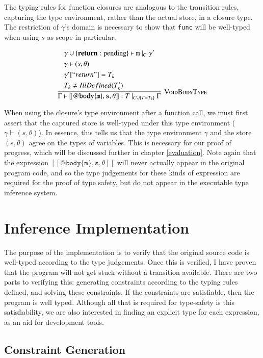 \documentclass[12pt,a4paper,twoside,openright]{report}
\newcommand*{\js}{\texttt}
\begin{document}
The typing rules for function closures are analogous to the transition rules,
capturing the type environment, rather than the actual store, in a closure
type. The restriction of $\gamma$'s domain is necessary to show that \js{func} will be 
well-typed when using $s$ as scope in particular.

$$\infer[\textsc{VoidBodyType}]{
	\Gamma\vdash\mathtt{[\![@body\{m\},s,\theta]\!]}:T\ |_{C\cup\{T=T_k\}}\ \Gamma
}{
	\begin{split}
		&\gamma\cup\{\mathbf{return}:\textrm{pending}\} \vdash \mathtt{m}\ |_C\ \gamma' \\
		&\gamma \vdash (s, \theta) \\
		&\gamma'[``return"] = T_k\\
		&T_k \neq IllDefined(T_k')
	\end{split}
}$$

When using the closure's type environment after a function call, we must first
assert that the captured store is well-typed under this type environment
($\gamma \vdash (s, \theta)$). In essence, this tells us that the type
environment $\gamma$ and the store $(s, \theta)$ agree on the types of
variables. This is necessary for our proof of progress, which will be discussed
further in chapter \ref{evaluation}. Note again that the expression
$\mathtt{[\![@body\{m\},s,\theta]\!]}$ will never actually appear in the
original program code, and so the type judgements for these kinds of expression
are required for the proof of type safety, but do not appear in the executable
type inference system.

\section{Inference Implementation}
The purpose of the implementation is to verify that the original source code is
well-typed according to the type judgements. Once this is verified, I have
proven that the program will not get stuck without a transition available.
There are two parts to verifying this: generating constraints according to the
typing rules defined, and solving these constraints. If the constraints are
satisfiable, then the program is well typed. Although all that is required for
type-safety is this satisfiability, we are also interested in finding an
explicit type for each expression, as an aid for development tools.

\subsection{Constraint Generation}
\end{document}

